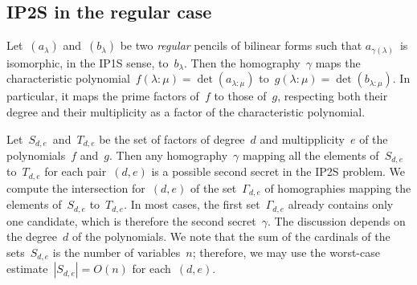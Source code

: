 \documentclass{amsart}
\def\abs#1{\left|#1\right|}
\def\mat#1{\begin{pmatrix}#1\end{pmatrix}}
\def\smat{\def\arraystretch{.66}\mat}
\def\card#1{\abs{#1}}
\DeclareMathOperator\GL{GL}
\begin{document}
% 
% 


\subsection{IP2S in the regular case}

Let~$(a_{λ})$ and~$(b_{λ})$ be two \emph{regular} pencils of bilinear
forms such that $a_{γ(λ)}$~is isomorphic, in the IP1S sense, to~$b_{λ}$.
Then the homography~$γ$ maps the characteristic polynomial~$f(λ:μ)
= \det (a_{λ:μ})$ to~$g(λ:μ) = \det (b_{λ:μ})$. In particular, it maps the
prime factors of~$f$ to those of~$g$, respecting both their degree and
their multiplicity as a factor of the characteristic polynomial.

Let~$S_{d,e}$~and~$T_{d,e}$ be the set of factors of degree~$d$ and
multipplicity~$e$ of the polynomials~$f$ and~$g$.
Then any homography~$γ$ mapping all the elements of~$S_{d,e}$ to~$T_{d,e}$
for each pair~$(d,e)$ is a possible second secret in the IP2S problem.
We compute the intersection for~$(d,e)$ of
the set~$Γ_{d,e}$ of homographies mapping
the elements of~$S_{d,e}$ to~$T_{d,e}$.
In most cases, the first set~$Γ_{d,e}$ already contains only one candidate,
which is therefore the second secret~$γ$.
The discussion depends on the degree~$d$ of the polynomials.
We note that the sum of the cardinals of the sets~$S_{d,e}$ is
the number of variables~$n$;
therefore, we may use the worst-case estimate~$\card{S_{d,e}} = O(n)$
for each~$(d,e)$.
\end{document}
